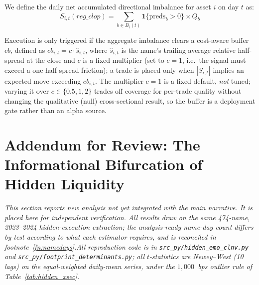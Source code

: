 \documentclass[11pt]{article}
\begin{document}
We define the daily net accumulated directional imbalance for asset $i$ on day $t$ as:
\begin{equation}
S_{i,t}(reg\_clop) = \sum_{b \in B_i(t)} \mathbf{1}\{ \text{preds}_b > 0 \} \times Q_b
\end{equation}

Execution is only triggered if the aggregate imbalance clears a cost-aware buffer $cb$, defined as $cb_{i,t}=c\cdot \hat{s}_{i,t}$, where $\hat{s}_{i,t}$ is the name's trailing average relative half-spread at the close and $c$ is a fixed multiplier (set to $c=1$, i.e.\ the signal must exceed a one-half-spread friction); a trade is placed only when $|S_{i,t}|$ implies an expected move exceeding $cb_{i,t}$. The multiplier $c=1$ is a fixed default, \emph{not} tuned; varying it over $c\in\{0.5,1,2\}$ trades off coverage for per-trade quality without changing the qualitative (null) cross-sectional result, so the buffer is a deployment gate rather than an alpha source.

\section{Addendum for Review: The Informational Bifurcation of Hidden Liquidity}
\label{sec:bifurcation}
\emph{This section reports new analysis not yet integrated with the main narrative. It
is placed here for independent verification. All results draw on the same 474-name,
2023--2024 hidden-execution extraction; the analysis-ready name-day count differs by test
according to what each estimator requires, and is reconciled in
footnote~\ref{fn:namedays}.\footnotemark[1] All reproduction code is in
\texttt{src\_py/hidden\_emo\_clnv.py} and \texttt{src\_py/footprint\_determinants.py}; all
$t$-statistics are Newey--West (10 lags) on the equal-weighted daily-mean series, under
the $1{,}000$~bps outlier rule of Table~\ref{tab:hidden_xsec}.}
\end{document}
